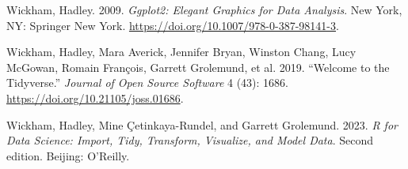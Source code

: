 \documentclass[
  letterpaper,
  DIV=11,
  numbers=noendperiod]{scrreprt}
\newlength{\cslhangindent}
\newlength{\cslentryspacingunit} %
\newenvironment{CSLReferences}[2] %
 {%
  \setlength{\parindent}{0pt}
  \ifodd #1
  \let\oldpar\par
  \def\par{\hangindent=\cslhangindent\oldpar}
  \fi
  \setlength{\parskip}{#2\cslentryspacingunit}
 }%
 {}
\begin{document}
\begin{CSLReferences}{1}{0}
\leavevmode{}%
Wickham, Hadley. 2009. \emph{Ggplot2: {Elegant Graphics} for {Data
Analysis}}. {New York, NY}: {Springer New York}.
\url{https://doi.org/10.1007/978-0-387-98141-3}.

\leavevmode{}%
Wickham, Hadley, Mara Averick, Jennifer Bryan, Winston Chang, Lucy
McGowan, Romain François, Garrett Grolemund, et al. 2019. {``Welcome to
the {Tidyverse}.''} \emph{Journal of Open Source Software} 4 (43): 1686.
\url{https://doi.org/10.21105/joss.01686}.

\leavevmode{}%
Wickham, Hadley, Mine Çetinkaya-Rundel, and Garrett Grolemund. 2023.
\emph{R for Data Science: Import, Tidy, Transform, Visualize, and Model
Data}. Second edition. {Beijing}: {O'Reilly}.

\end{CSLReferences}
\end{document}
